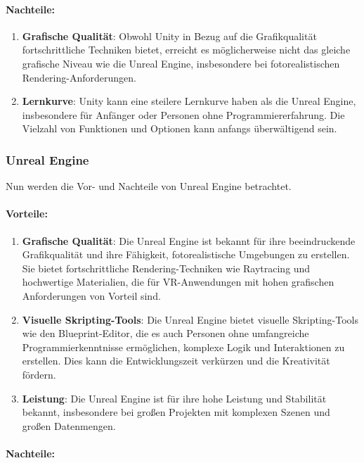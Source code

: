 \paragraph{Nachteile:}

\begin{enumerate}
\item \textbf{Grafische Qualität}: Obwohl Unity in Bezug auf die Grafikqualität fortschrittliche Techniken bietet, erreicht es möglicherweise nicht das gleiche grafische Niveau wie die Unreal Engine, insbesondere bei fotorealistischen Rendering-Anforderungen.
\item \textbf{Lernkurve}: Unity kann eine steilere Lernkurve haben als die Unreal Engine, insbesondere für Anfänger oder Personen ohne Programmiererfahrung. Die Vielzahl von Funktionen und Optionen kann anfangs überwältigend sein.
\end{enumerate}

\subsubsection{Unreal Engine}
Nun werden die Vor- und Nachteile von Unreal Engine betrachtet.
\paragraph{Vorteile:}

\begin{enumerate}
\item \textbf{Grafische Qualität}: Die Unreal Engine ist bekannt für ihre beeindruckende Grafikqualität und ihre Fähigkeit, fotorealistische Umgebungen zu erstellen. Sie bietet fortschrittliche Rendering-Techniken wie Raytracing und hochwertige Materialien, die für VR-Anwendungen mit hohen grafischen Anforderungen von Vorteil sind.
\item \textbf{Visuelle Skripting-Tools}: Die Unreal Engine bietet visuelle Skripting-Tools wie den Blueprint-Editor, die es auch Personen ohne umfangreiche Programmierkenntnisse ermöglichen, komplexe Logik und Interaktionen zu erstellen. Dies kann die Entwicklungszeit verkürzen und die Kreativität fördern.

\item \textbf{Leistung}: Die Unreal Engine ist für ihre hohe Leistung und Stabilität bekannt, insbesondere bei großen Projekten mit komplexen Szenen und großen Datenmengen.
\end{enumerate}

\paragraph{Nachteile:}

